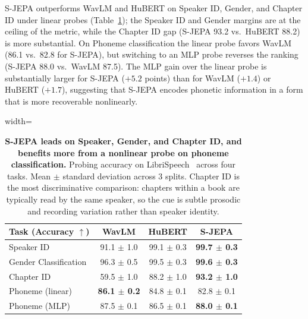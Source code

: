 \documentclass[9pt,twocolumn]{article}
\theoremstyle{plain}
\theoremstyle{definition}
\theoremstyle{remark}
\begin{document}
S-JEPA outperforms WavLM and HuBERT on Speaker ID, Gender, and Chapter ID under linear probes (Table~\ref{tab:probing}); the Speaker ID and Gender margins are at the ceiling of the metric, while the Chapter ID gap (S-JEPA 93.2 vs.\ HuBERT 88.2) is more substantial. On Phoneme classification the linear probe favors WavLM (86.1 vs.\ 82.8 for S-JEPA), but switching to an MLP probe reverses the ranking (S-JEPA 88.0 vs.\ WavLM 87.5). The MLP gain over the linear probe is substantially larger for S-JEPA ($+5.2$ points) than for WavLM ($+1.4$) or HuBERT ($+1.7$), suggesting that S-JEPA encodes phonetic information in a form that is more recoverable nonlinearly.


 \begin{table}[h]
\centering
\caption{\textbf{S-JEPA leads on Speaker, Gender, and Chapter ID, and benefits more from a nonlinear probe on phoneme classification.} Probing accuracy on LibriSpeech~\citep{panayotov2015librispeech} across four tasks. Mean $\pm$ standard deviation across 3 splits. Chapter ID is the most discriminative comparison: chapters within a book are typically read by the same speaker, so the cue is subtle prosodic and recording variation rather than speaker identity.}
\label{tab:probing}
\small
\setlength{\tabcolsep}{8pt}
\renewcommand{\arraystretch}{1.15}
\begin{adjustbox}{width=\columnwidth}
\begin{tabular}{lccc}
\toprule
\textbf{Task (Accuracy $\uparrow$)} & \textbf{WavLM} & \textbf{HuBERT} & \textbf{S-JEPA} \\
\midrule
Speaker ID            & 91.1 $\pm$ 1.0          & 99.1 $\pm$ 0.3          & \textbf{99.7 $\pm$ 0.3} \\
Gender Classification & 96.3 $\pm$ 0.5          & 99.5 $\pm$ 0.3          & \textbf{99.6 $\pm$ 0.3} \\
Chapter ID            & 59.5 $\pm$ 1.0          & 88.2 $\pm$ 1.0          & \textbf{93.2 $\pm$ 1.0} \\
\midrule
Phoneme (linear)      & \textbf{86.1 $\pm$ 0.2} & 84.8 $\pm$ 0.1          & 82.8 $\pm$ 0.1          \\
Phoneme (MLP)         & 87.5 $\pm$ 0.1          & 86.5 $\pm$ 0.1          & \textbf{88.0 $\pm$ 0.1} \\
\bottomrule
\end{tabular}
\end{adjustbox}
\end{table}
\end{document}
